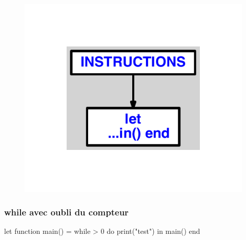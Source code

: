 \documentclass{article}
\begin{document}
\begin{figure}[H]\centering\includegraphics[max width=\textwidth]{ast/ast_315.pdf}\end{figure}\subsubsection{while avec oubli du compteur}
\begin{verbatimtab}
let
	function main() =
		while > 0 do
			print("test")
in main() end
\end{verbatimtab}
\end{document}
